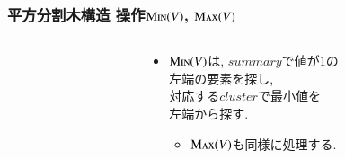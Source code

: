 \documentclass[main]{subfiles}
\begin{document}
\begin{frame}\frametitle{平方分割木構造 操作$\mathrm{\text{M\textsc{in}}}(V)$, $\mathrm{\text{M\textsc{ax}}}(V)$}
\begin{columns}[c]
\begin{column}{0.4\linewidth} \end{column}
\begin{column}{0.59\linewidth}
\begin{itemize}
\item $\mathrm{\text{M\textsc{in}}}(V)$は, $summary$で値が$1$の\\左端の要素を探し, \\ 対応する$cluster$で最小値を\\左端から探す.
\begin{itemize}
	\item $\mathrm{\text{M\textsc{ax}}}(V)$も同様に処理する.
\end{itemize}
\end{itemize}
 \end{column}
\end{columns}

\end{frame}
\end{document}
